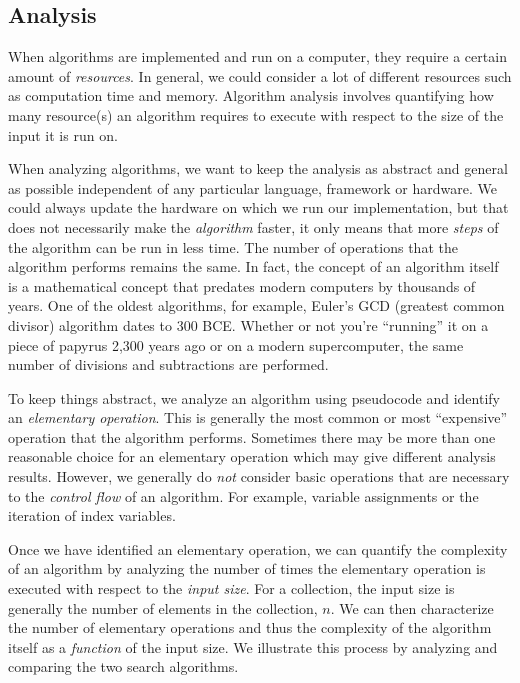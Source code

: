 

\subsection{Analysis}

When algorithms are implemented and run on a computer, they require a
certain amount of \emph{resources}.  In general, we could consider a lot
of different resources such as computation time and memory.  Algorithm
analysis involves quantifying how many resource(s) an algorithm requires
to execute with respect to the size of the input it is run on.

When analyzing algorithms, we want to keep the analysis as abstract and 
general as possible independent of any particular language, framework or
hardware.  We could always update the hardware on which we run our implementation, 
but that does not necessarily make the \emph{algorithm} faster, it only means
that more \emph{steps} of the algorithm can be run in less time.  The
number of operations that the algorithm performs remains the same.  In
fact, the concept of an algorithm itself is a mathematical concept that
predates modern computers by thousands of years.  One of the oldest algorithms,
for example, Euler's GCD (greatest common divisor) algorithm dates to 300
BCE.  Whether or not you're ``running'' it on a piece of papyrus 2,300 years
ago or on a modern supercomputer, the same number of divisions and subtractions
are performed.

To keep things abstract, we analyze an algorithm using pseudocode and identify
an \emph{elementary operation}.  This is generally the most common or most
``expensive'' operation that the algorithm performs.  Sometimes there may be more
than one reasonable choice for an elementary operation which may give different
analysis results.  However, we generally do \emph{not} consider basic operations
that are necessary to the \emph{control flow} of an algorithm.  For example, 
variable assignments or the iteration of index variables.

Once we have identified an elementary operation, we can quantify the complexity
of an algorithm by analyzing the number of times the elementary operation is
executed with respect to the \emph{input size}.  For a collection, the input
size is generally the number of elements in the collection, $n$.  We can
then characterize the number of elementary operations and thus the complexity
of the algorithm itself as a \emph{function} of the input size.  We illustrate
this process by analyzing and comparing the two search algorithms.

